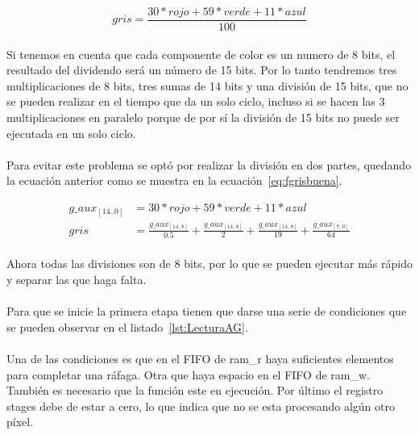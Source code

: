 \documentclass[a4paper,12pt,titlepage,final]{book}
\begin{document}
\begin{equation}\label{eq:fgrismala}
gris = \frac{30*rojo + 59*verde + 11*azul}{100}
\end{equation}

\paragraph{}
Si tenemos en cuenta que cada componente de color es un numero de 8 bits, el resultado del dividendo será un número de 15 bits. Por lo tanto tendremos tres multiplicaciones de 8 bits, tres sumas de 14 bits y una división de 15 bits, que no se pueden realizar en el tiempo que da un solo ciclo, incluso si se hacen las 3 multiplicaciones en paralelo porque de por sí la división de 15 bits no puede ser ejecutada en un solo ciclo. 

\paragraph{}
Para evitar este problema se optó por realizar la división en dos partes, quedando la ecuación anterior como se muestra en la ecuación~\ref{eq:fgrisbuena}.

\begin{subequations}\label{eq:fgrisbuena}
\begin{align}
        g\_aux_{[14..0]}&=30*rojo + 59*verde + 11*azul\\
        gris &= \frac{g\_aux_{[14..8]}}{0.5}+\frac{g\_aux_{[14..8]}}{2}+\frac{g\_aux_{[14..8]}}{19}+\frac{g\_aux_{[7..0]}}{64}
\end{align}
\end{subequations}

\paragraph{}
Ahora todas las divisiones son de 8 bits, por lo que se pueden ejecutar más rápido y separar las que haga falta.

\paragraph{}
Para que se inicie la primera etapa tienen que darse una serie de condiciones que se pueden observar en el listado~\ref{lst:LecturaAG}.



\paragraph{}
Una de las condiciones es que en el FIFO de ram\_r haya suficientes elementos para completar una ráfaga. Otra que haya espacio en el FIFO de ram\_w. También es necesario que la función este en ejecución. Por último el registro stages debe de estar a cero, lo que indica que no se esta procesando algún otro píxel.
\end{document}
